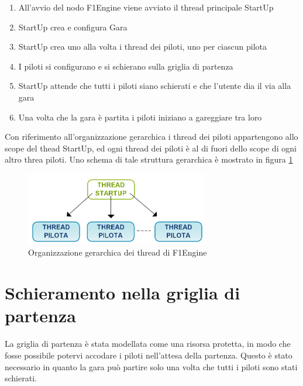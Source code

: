 \documentclass[a4paper,11pt, twoside]{book}
\begin{document}
      \begin{enumerate}
        \item All'avvio del nodo F1Engine viene avviato il thread principale StartUp
	\item StartUp crea e configura Gara
	\item StartUp crea uno alla volta i thread dei piloti, uno per ciascun pilota
	\item I piloti si configurano e si schierano sulla griglia di partenza
	\item StartUp attende che tutti i piloti siano schierati e che l'utente dia il via alla gara
	\item Una volta che la gara è partita i piloti iniziano a gareggiare tra loro
      \end{enumerate}
      
      Con riferimento all'organizzazione gerarchica i thread dei piloti appartengono allo scope del thead StartUp,
      ed ogni thread dei piloti è al di fuori dello scope di ogni altro threa piloti. Uno schema di tale
      struttura gerarchica è mostrato in figura \ref{fig:OrganizzazioneThreadF1Engine}
      
      \begin{figure}[ht]
	\centering
	\includegraphics[width=80mm]{./Immagini/OrganizzazioneThreadF1Engine.png}
	\caption{Organizzazione gerarchica dei thread di F1Engine}
	\label{fig:OrganizzazioneThreadF1Engine}
      \end{figure}

    
    \section{Schieramento nella griglia di partenza}
    \label{Schieramento nella griglia di partenza}
      La griglia di partenza è stata modellata come una risorsa protetta, in modo che fosse possibile
      potervi accodare i piloti
      nell'attesa della partenza. Questo è stato necessario in quanto la gara può partire solo 
      una volta che tutti i piloti sono stati schierati.
      
\end{document}
